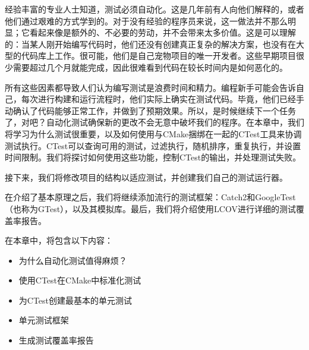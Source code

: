 经验丰富的专业人士知道，测试必须自动化。这是几年前有人向他们解释的，或者他们通过艰难的方式学到的。对于没有经验的程序员来说，这一做法并不那么明显；它看起来像是额外的、不必要的劳动，并不会带来太多价值。这是可以理解的：当某人刚开始编写代码时，他们还没有创建真正复杂的解决方案，也没有在大型的代码库上工作。很可能，他们是自己宠物项目的唯一开发者。这些早期项目很少需要超过几个月就能完成，因此很难看到代码在较长时间内是如何恶化的。

所有这些因素都导致人们认为编写测试是浪费时间和精力。编程新手可能会告诉自己，每次进行构建和运行流程时，他们实际上确实在测试代码。毕竟，他们已经手动确认了代码能够正常工作，并做到了预期效果。所以，是时候继续下一个任务了，对吧？自动化测试确保新的更改不会无意中破坏我们的程序。在本章中，我们将学习为什么测试很重要，以及如何使用与CMake捆绑在一起的CTest工具来协调测试执行。CTest可以查询可用的测试，过滤执行，随机排序，重复执行，并设置时间限制。我们将探讨如何使用这些功能，控制CTest的输出，并处理测试失败。

接下来，我们将修改项目的结构以适应测试，并创建我们自己的测试运行器。

在介绍了基本原理之后，我们将继续添加流行的测试框架：Catch2和GoogleTest（也称为GTest），以及其模拟库。最后，我们将介绍使用LCOV进行详细的测试覆盖率报告。

在本章中，将包含以下内容：

\begin{itemize}
\item
为什么自动化测试值得麻烦？

\item
使用CTest在CMake中标准化测试

\item
为CTest创建最基本的单元测试

\item
单元测试框架

\item
生成测试覆盖率报告
\end{itemize}




















